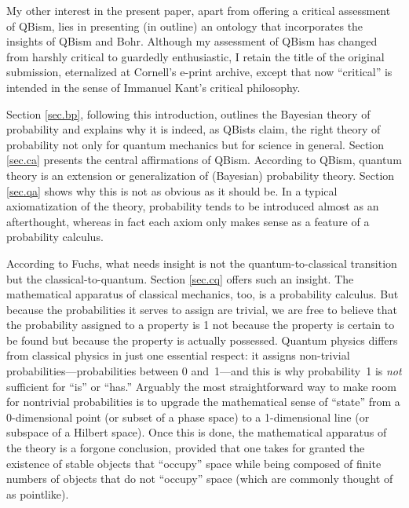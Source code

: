 \documentclass[smallextended]{svjour3}
\begin{document}
My other interest in the present paper, apart from offering a critical assessment of QBism, lies in presenting (in outline) an ontology that incorporates the insights of QBism and Bohr. Although my assessment of QBism has changed from harshly critical to guardedly enthusiastic, I retain the title of the original submission, eternalized at Cornell's e-print archive,\cite{QBCAv1} except that now ``critical'' is intended in the sense of Immanuel Kant's critical philosophy.
 
Section \ref{sec.bp}, following this introduction, outlines the Bayesian theory of probability and explains why it is indeed, as QBists claim, the right theory of probability not only for quantum mechanics but for science in general. Section \ref{sec.ca} presents the central affirmations of QBism. According to QBism, quantum theory is an extension or generalization of (Bayesian) probability theory. Section \ref{sec.qa} shows why this is not as obvious as it should be. In a typical axiomatization of the theory, probability tends to be introduced almost as an afterthought, whereas in fact each axiom only makes sense as a feature of a probability calculus.

According to Fuchs,\cite{FuchsPeri} what needs insight is not the quantum-to-classical transition but the classical-to-quantum. Section \ref{sec.cq} offers such an insight. The mathematical apparatus of classical mechanics, too, is a probability calculus. But because the probabilities it serves to assign are trivial, we are free to believe that the probability assigned to a property is 1 not because the property is certain to be found but because the property is actually possessed. Quantum physics differs from classical physics in just one essential respect: it assigns non-trivial probabilities---probabilities between 0 and~1---and this is why probability~1 is \emph{not} sufficient for ``is'' or ``has.'' Arguably the most straightforward way to make room for nontrivial probabilities is to upgrade the mathematical sense of ``state'' from a \hbox{0-dimensional} point (or subset of a phase space) to a 1-dimensional line (or subspace of a Hilbert space). Once this is done, the mathematical apparatus of the theory is a forgone conclusion, provided that one takes for granted the existence of stable objects that ``occupy'' space while being composed of finite numbers of objects that do not ``occupy'' space (which are commonly thought of as pointlike). 
\end{document}
